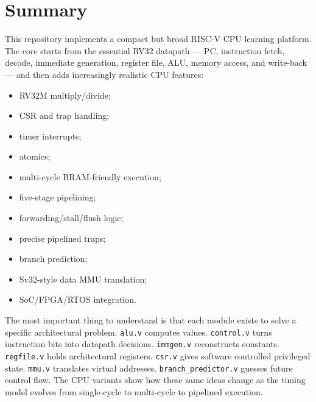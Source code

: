 \section{Summary}

This repository implements a compact but broad RISC-V CPU learning platform. The core starts from the essential RV32 datapath — PC, instruction fetch, decode, immediate generation, register file, ALU, memory access, and write-back — and then adds increasingly realistic CPU features:

\begin{itemize}
\item RV32M multiply/divide;
\item CSR and trap handling;
\item timer interrupts;
\item atomics;
\item multi-cycle BRAM-friendly execution;
\item five-stage pipelining;
\item forwarding/stall/flush logic;
\item precise pipelined traps;
\item branch prediction;
\item Sv32-style data MMU translation;
\item SoC/FPGA/RTOS integration.
\end{itemize}
The most important thing to understand is that each module exists to solve a specific architectural problem. \texttt{alu.v} computes values. \texttt{control.v} turns instruction bits into datapath decisions. \texttt{immgen.v} reconstructs constants. \texttt{regfile.v} holds architectural registers. \texttt{csr.v} gives software controlled privileged state. \texttt{mmu.v} translates virtual addresses. \texttt{branch\_predictor.v} guesses future control flow. The CPU variants show how these same ideas change as the timing model evolves from single-cycle to multi-cycle to pipelined execution.
